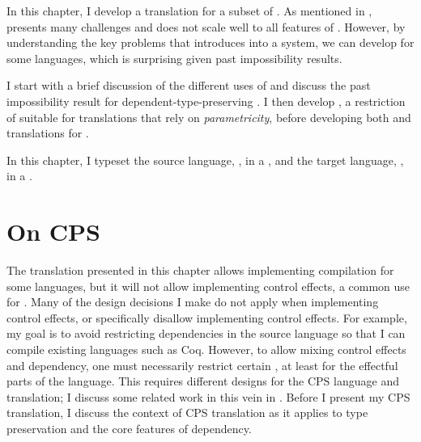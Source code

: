 \label{sec:cps:intro}
In this chapter, I develop a   translation for a
subset of \slang.
As mentioned in ,  presents many challenges and
does not scale well to all features of .
However, by understanding the key problems that  introduces into
a  system, we can develop   for some  languages, which is
surprising given past impossibility results.

I start with a brief discussion of the different uses of  and discuss
the past impossibility result for dependent-type-preserving .
I then develop \cpsslang, a restriction of \slang suitable for translations that
rely on \emph{parametricity}, before developing both 
and    translations for \cpsslang.

\begin{typographical}
  In this chapter, I typeset the source language, \cpsslang, in a
  \emph{}, and the target language,
  \cpstlang, in a \emph{}.
\end{typographical}

\section{On {{CPS}}}
The  translation presented in this chapter allows
implementing  compilation for some  languages, but it will not allow implementing control effects, a common
  use for .
Many of the design decisions I make do not apply when implementing control
effects, or specifically disallow implementing control effects.
For example, my goal is to avoid restricting dependencies in the source
language so that I can compile existing languages such as Coq.
However, to allow mixing control effects and dependency, one must necessarily
restrict certain , at least for the effectful parts of the
language.
This requires different designs for the CPS language and translation; I discuss
some related work in this vein in .
Before I present my CPS translation, I discuss the context of CPS translation as it
applies to type preservation and the core features of dependency.

